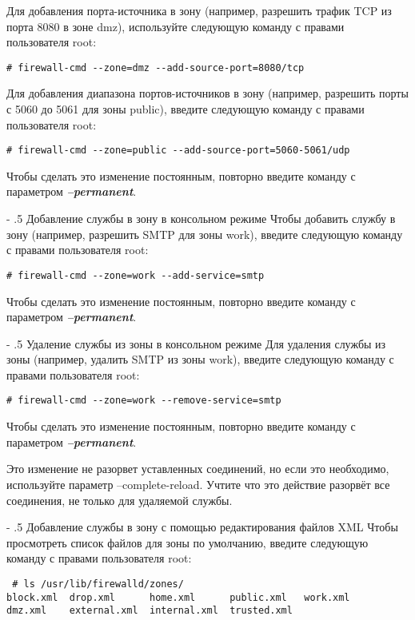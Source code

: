 \documentclass[a4paper,10pt,twoside]{article}
\makeatletter
\renewcommand\paragraph{%
   \@startsection{paragraph}{4}{0mm}%
      {-\baselineskip}%
      {.5\baselineskip}%
      {\normalfont\normalsize\bfseries}}
\makeatother
\begin{document}
Для добавления порта-источника в зону (например, разрешить трафик TCP из порта 8080 в зоне dmz), используйте следующую команду с правами пользователя root: 
\begin{verbatim}
# firewall-cmd --zone=dmz --add-source-port=8080/tcp
\end{verbatim} 
Для добавления диапазона портов-источников в зону (например, разрешить порты с 5060 до 5061 для зоны public), введите следующую команду с правами пользователя root: 

\begin{verbatim}
# firewall-cmd --zone=public --add-source-port=5060-5061/udp
\end{verbatim} 
Чтобы сделать это изменение постоянным, повторно введите команду с параметром \textit{\textbf{--permanent}}.


\paragraph{Добавление службы в зону в консольном режиме}
Чтобы добавить службу в зону (например, разрешить SMTP для зоны work), введите следующую команду с правами пользователя root: 
\begin{verbatim}
# firewall-cmd --zone=work --add-service=smtp
\end{verbatim} 
Чтобы сделать это изменение постоянным, повторно введите команду с параметром \textit{\textbf{--permanent}}.


\paragraph{Удаление службы из зоны в консольном режиме}
Для удаления службы из зоны (например, удалить SMTP из зоны work), введите следующую команду с правами пользователя root: 
\begin{verbatim}
# firewall-cmd --zone=work --remove-service=smtp
\end{verbatim} 
Чтобы сделать это изменение постоянным, повторно введите команду с параметром \textit{\textbf{--permanent}}.

Это изменение не  разорвет уставленных соединений, но если это необходимо, используйте параметр --complete-reload. Учтите что это действие разорвёт все соединения, не только для удаляемой службы.



\paragraph{Добавление службы в зону с помощью редактирования файлов XML}
Чтобы просмотреть список файлов для зоны по умолчанию, введите следующую команду с правами пользователя root: 
\begin{verbatim}
 # ls /usr/lib/firewalld/zones/
block.xml  drop.xml      home.xml      public.xml   work.xml
dmz.xml    external.xml  internal.xml  trusted.xml
\end{verbatim} 
\end{document}
